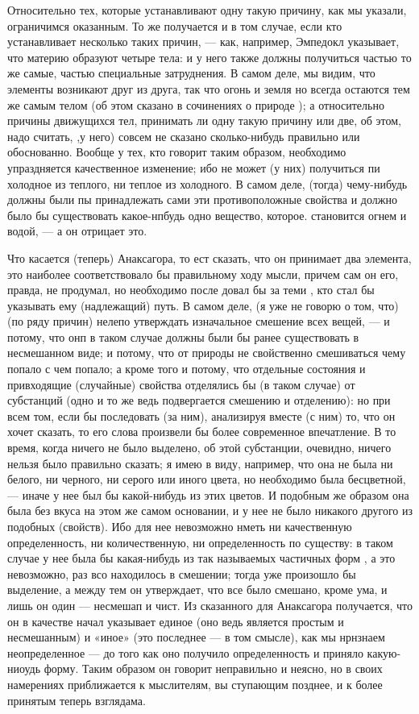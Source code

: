 \documentclass{article}
\begin{document}
Относительно тех, которые устанавливают одну такую причину, как мы указали, ограничимся оказанным. То же получается и в том случае, если кто устанавливает несколько таких причин, --- как, например, Эмпедокл указывает, что материю образуют четыре тела: и у него также должны получиться частью то же самые, частью специальные затруднения. В самом деле, мы видим, что элементы возникают друг из друга, так что огонь и земля но всегда остаются тем же самым телом (об этом сказано в сочинениях о природе
\footnotemark[2]
); а относительно причины движущихся тел, принимать ли одну такую причину или две, об этом, надо считать, ,у него) совсем не сказано сколько-нибудь правильно или обоснованно. Вообще у тех, кто говорит таким образом, необходимо упраздняется качественное изменение; ибо не может (у них) получиться пи холодное из теплого, ни теплое из холодного. В самом деле, (тогда) чему-нибудь должны были пы принадлежать сами эти противоположные свойства и должно было бы существовать какое-нпбудь одно вещество, которое. становится огнем и водой, --- а он отрицает это.

Что касается (теперь) Анаксагора, то ест сказать, что он принимает два элемента, это наиболее соответствовало бы правильному ходу мысли, причем сам он его, правда, не продумал, но необходимо после довал бы за теми , кто стал бы указывать ему (надлежащий) путь. В самом деле, (я уже не говорю о том, что) (по ряду причин) нелепо утверждать изначальное смешение всех вещей, --- и потому, что онп в таком случае должны были бы ранее существовать в несмешанном виде; и потому, что от природы не свойственно смешиваться чему попало с чем попало; а кроме того и потому, что отдельные состояния и привходящие (случайные) свойства отделялись бы (в таком случае) от субстанций (одно и то же ведь подвергается смешению и отделению): но при всем том, если бы последовать (за ним), анализируя вместе (с ним) то, что он хочет сказать, то его слова произвели бы более современное впечатление. В то время, когда ничего не было выделено, об этой субстанции, очевидно, ничего нельзя было правильно сказать; я имею в виду, например, что она не была ни белого, ни черного, ни серого или иного цвета, но необходимо была бесцветной, --- иначе у нее был бы какой-нибудь из этих цветов. И подобным же образом она была без вкуса на этом же самом основании, и у нее не было никакого другого из подобных (свойств). Ибо для нее невозможно нметь ни качественную определенность, ни количественную, ни определенность по существу:
\footnotemark[3]
в таком случае у нее была бы какая-нибудь из так называемых частичных форм , а это невозможно, раз всо находилось в смешении; тогда уже произошло бы выделение, а между тем он утверждает, что все было смешано, кроме ума, и лишь он один --- несмешап и чист. Из сказанного для Анаксагора получается, что он в качестве начал указывает единое (оно ведь является простым и несмешанным) и «иное» (это последнее --- в том смысле), как мы
\footnotemark[4]
нрнзнаем неопределенное --- до того как оно получило определенность и приняло какую-ниоудь форму. Таким образом он говорит неправильно и неясно, но в своих намерениях приближается к мыслителям, вы ступающим позднее, и к более принятым теперь взглядама.
\end{document}
